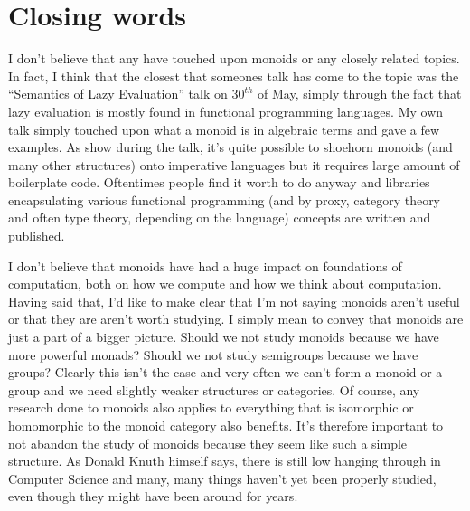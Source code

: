 \documentclass{acm_proc_article-sp}
\begin{document}
\section{Closing words}
I don't believe that any have touched upon monoids or any closely
related topics. In fact, I think that the closest that someones talk
has come to the topic was the ``Semantics of Lazy Evaluation'' talk on
$30^{th}$ of May, simply through the fact that lazy evaluation is
mostly found in functional programming languages. My own talk simply
touched upon what a monoid is in algebraic terms and gave a few
examples. As show during the talk, it's quite possible to shoehorn
monoids (and many other structures) onto imperative languages but it
requires large amount of boilerplate code. Oftentimes people find it
worth to do anyway and libraries encapsulating various functional
programming (and by proxy, category theory and often type theory,
depending on the language) concepts are written and
published\cite{java:functional}.

I don't believe that monoids have had a huge impact on foundations of
computation, both on how we compute and how we think about
computation. Having said that, I'd like to make clear that I'm not
saying monoids aren't useful or that they are aren't worth studying. I
simply mean to convey that monoids are just a part of a bigger
picture. Should we not study monoids because we have more powerful
monads? Should we not study semigroups because we have groups? Clearly
this isn't the case and very often we can't form a monoid or a group
and we need slightly weaker structures or categories. Of course, any
research done to monoids also applies to everything that is isomorphic
or homomorphic to the monoid category also benefits. It's therefore
important to not abandon the study of monoids because they seem like
such a simple structure. As Donald Knuth himself says, there is still
low hanging through in Computer Science and many, many things haven't
yet been properly studied, even though they might have been around for
years\cite{knuth:google}.



\balancecolumns
\end{document}
